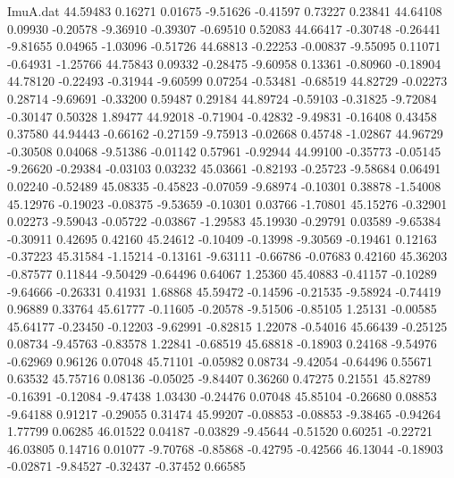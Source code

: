 \begin{filecontents}{ImuA.dat}
  44.59483    0.16271    0.01675   -9.51626   -0.41597    0.73227    0.23841
  44.64108    0.09930   -0.20578   -9.36910   -0.39307   -0.69510    0.52083
  44.66417   -0.30748   -0.26441   -9.81655    0.04965   -1.03096   -0.51726
  44.68813   -0.22253   -0.00837   -9.55095    0.11071   -0.64931   -1.25766
  44.75843    0.09332   -0.28475   -9.60958    0.13361   -0.80960   -0.18904
  44.78120   -0.22493   -0.31944   -9.60599    0.07254   -0.53481   -0.68519
  44.82729   -0.02273    0.28714   -9.69691   -0.33200    0.59487    0.29184
  44.89724   -0.59103   -0.31825   -9.72084   -0.30147    0.50328    1.89477
  44.92018   -0.71904   -0.42832   -9.49831   -0.16408    0.43458    0.37580
  44.94443   -0.66162   -0.27159   -9.75913   -0.02668    0.45748   -1.02867
  44.96729   -0.30508    0.04068   -9.51386   -0.01142    0.57961   -0.92944
  44.99100   -0.35773   -0.05145   -9.26620   -0.29384   -0.03103    0.03232
  45.03661   -0.82193   -0.25723   -9.58684    0.06491    0.02240   -0.52489
  45.08335   -0.45823   -0.07059   -9.68974   -0.10301    0.38878   -1.54008
  45.12976   -0.19023   -0.08375   -9.53659   -0.10301    0.03766   -1.70801
  45.15276   -0.32901    0.02273   -9.59043   -0.05722   -0.03867   -1.29583
  45.19930   -0.29791    0.03589   -9.65384   -0.30911    0.42695    0.42160
  45.24612   -0.10409   -0.13998   -9.30569   -0.19461    0.12163   -0.37223
  45.31584   -1.15214   -0.13161   -9.63111   -0.66786   -0.07683    0.42160
  45.36203   -0.87577    0.11844   -9.50429   -0.64496    0.64067    1.25360
  45.40883   -0.41157   -0.10289   -9.64666   -0.26331    0.41931    1.68868
  45.59472   -0.14596   -0.21535   -9.58924   -0.74419    0.96889    0.33764
  45.61777   -0.11605   -0.20578   -9.51506   -0.85105    1.25131   -0.00585
  45.64177   -0.23450   -0.12203   -9.62991   -0.82815    1.22078   -0.54016
  45.66439   -0.25125    0.08734   -9.45763   -0.83578    1.22841   -0.68519
  45.68818   -0.18903    0.24168   -9.54976   -0.62969    0.96126    0.07048
  45.71101   -0.05982    0.08734   -9.42054   -0.64496    0.55671    0.63532
  45.75716    0.08136   -0.05025   -9.84407    0.36260    0.47275    0.21551
  45.82789   -0.16391   -0.12084   -9.47438    1.03430   -0.24476    0.07048
  45.85104   -0.26680    0.08853   -9.64188    0.91217   -0.29055    0.31474
  45.99207   -0.08853   -0.08853   -9.38465   -0.94264    1.77799    0.06285
  46.01522    0.04187   -0.03829   -9.45644   -0.51520    0.60251   -0.22721
  46.03805    0.14716    0.01077   -9.70768   -0.85868   -0.42795   -0.42566
  46.13044   -0.18903   -0.02871   -9.84527   -0.32437   -0.37452    0.66585

\end{filecontents}
